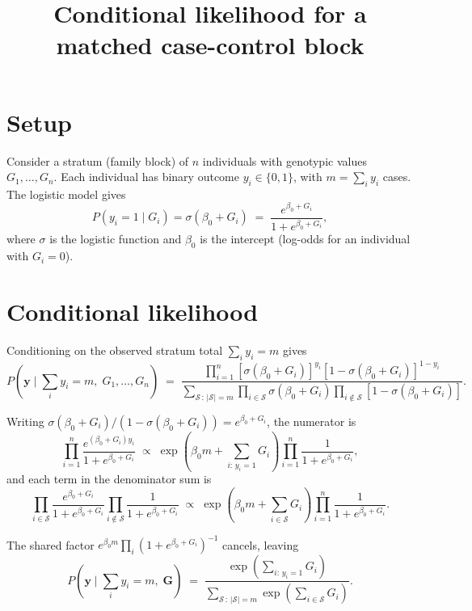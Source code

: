 \documentclass[12pt]{article}
\title{Conditional likelihood for a matched case-control block}
\author{}
\date{}
\begin{document}
\maketitle

\section*{Setup}

Consider a stratum (family block) of $n$ individuals with genotypic values
$G_1,\ldots,G_n$.  Each individual has binary outcome $y_i \in \{0,1\}$, with
$m = \sum_i y_i$ cases.  The logistic model gives
\[
  P(y_i = 1 \mid G_i) = \sigma(\beta_0 + G_i)
  \;=\;
  \frac{e^{\beta_0 + G_i}}{1 + e^{\beta_0 + G_i}},
\]
where $\sigma$ is the logistic function and $\beta_0$ is the intercept
(log-odds for an individual with $G_i = 0$).

\section*{Conditional likelihood}

Conditioning on the observed stratum total $\sum_i y_i = m$ gives
\begin{equation}
  P\!\left(\bm{y} \;\Big|\; \sum_i y_i = m,\; G_1,\ldots,G_n\right)
  \;=\;
  \frac{\displaystyle\prod_{i=1}^n \left[\sigma(\beta_0+G_i)\right]^{y_i}
        \left[1-\sigma(\beta_0+G_i)\right]^{1-y_i}}
       {\displaystyle\sum_{\mathcal{S}\,:\,|\mathcal{S}|=m}
        \prod_{i\in\mathcal{S}} \sigma(\beta_0+G_i)
        \prod_{i\notin\mathcal{S}} \left[1-\sigma(\beta_0+G_i)\right]}.
\end{equation}

Writing $\sigma(\beta_0+G_i)/(1-\sigma(\beta_0+G_i)) = e^{\beta_0+G_i}$,
the numerator is
\[
  \prod_{i=1}^n \frac{e^{(\beta_0+G_i)y_i}}{1+e^{\beta_0+G_i}}
  \;\propto\;
  \exp\!\left(\beta_0 m + \sum_{i:\,y_i=1} G_i\right)
  \prod_{i=1}^n \frac{1}{1+e^{\beta_0+G_i}},
\]
and each term in the denominator sum is
\[
  \prod_{i\in\mathcal{S}}\frac{e^{\beta_0+G_i}}{1+e^{\beta_0+G_i}}
  \prod_{i\notin\mathcal{S}}\frac{1}{1+e^{\beta_0+G_i}}
  \;\propto\;
  \exp\!\left(\beta_0 m + \sum_{i\in\mathcal{S}} G_i\right)
  \prod_{i=1}^n \frac{1}{1+e^{\beta_0+G_i}}.
\]

The shared factor $e^{\beta_0 m}\prod_i(1+e^{\beta_0+G_i})^{-1}$ cancels, leaving
\begin{equation}
  \boxed{
  P\!\left(\bm{y} \;\Big|\; \sum_i y_i = m,\; \bm{G}\right)
  \;=\;
  \frac{\exp\!\left(\displaystyle\sum_{i:\,y_i=1} G_i\right)}
       {\displaystyle\sum_{\mathcal{S}\,:\,|\mathcal{S}|=m}
        \exp\!\left(\displaystyle\sum_{i\in\mathcal{S}} G_i\right)}.
  }
\end{equation}
\end{document}
